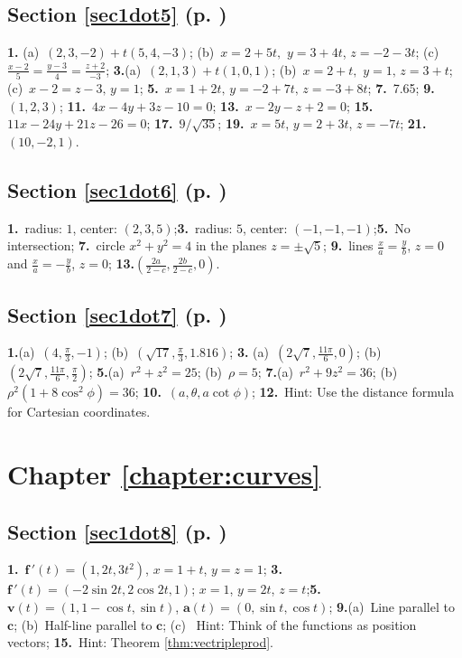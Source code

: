 \begin{multicols}{2}
\subsection*{Section \ref{sec1dot5} (p. \pageref{sec1dot5})}
\textbf{1.}
(a)~$(2,3,-2) + t(5,4,-3)$;\quad 
(b)~$x = 2 + 5t,$ $y = 3 + 4t$, $z = -2 - 3t$;\quad 
(c)~$\frac{x - 2}{5} = \frac{y - 3}{4} = \frac{z + 2}{-3}$;\quad
\textbf{3.}(a)~$(2,1,3) + t(1,0,1)$;\quad 
(b)~$x = 2 + t,$ $y = 1, \, z = 3 + t$;\quad 
(c)~$x - 2 = z - 3, \, y = 1$;\quad
\textbf{5.}~$x = 1 + 2t, \, y = -2 + 7t, \, z = -3 + 8t$;\quad
\textbf{7.}~7.65;\quad
\textbf{9.}~$(1,2,3)$;\quad
\textbf{11.}~$4x - 4y + 3z - 10 = 0$;\quad
\textbf{13.}~$x - 2y - z + 2 = 0$;\quad
\textbf{15.}~$11x - 24y + 21z - 26 = 0$;\quad 
\textbf{17.}~$9/\sqrt{35}$;\quad
\textbf{19.}~$x = 5t$, $y = 2 + 3t$, $z = -7t$;\quad
\textbf{21.}~$(10,-2,1)$.

\subsection*{Section \ref{sec1dot6} (p. \pageref{sec1dot6})}
\textbf{1.}~radius: $1$, center: $(2,3,5)$;\quad \textbf{3.}~radius: $5$, center: $(-1,-1,-1)$;\quad \textbf{5.}~No intersection;\quad
\textbf{7.}~circle $x^2 + y^2 = 4$ in the planes $z = \pm \sqrt{5}$;\quad
\textbf{9.}~lines
$\frac{x}{a} = \frac{y}{b}$, $z = 0$ and $\frac{x}{a} = -\frac{y}{b}$, $z = 0$;\quad
\textbf{13.}$\left( \frac{2a}{2 - c}, \frac{2b}{2 - c}, 0 \right)$.

\subsection*{Section \ref{sec1dot7} (p. \pageref{sec1dot7})}
\textbf{1.}(a)~$(4,\frac{\pi}{3},-1)$;\quad 
(b)~$(\sqrt{17},\frac{\pi}{3},1.816)$;\quad
\textbf{3.}
(a)~$(2\sqrt{7},\frac{11\pi}{6},0)$;\quad 
(b)~$(2\sqrt{7},\frac{11\pi}{6},\frac{\pi}{2})$;\quad
\textbf{5.}(a)~$r^2 + z^2 = 25$;\quad
(b)~$\rho = 5$;\quad
\textbf{7.}(a)~$r^2 + 9z^2 = 36$;\quad 
(b)~$\rho^2 ( 1 + 8 \cos^2 \phi ) = 36$;\quad
\textbf{10.}~$(a,\theta,a \cot \phi )$;\quad 
\textbf{12.}~Hint: Use the distance formula for Cartesian coordinates.

\section*{Chapter \ref{chapter:curves}}
\subsection*{Section \ref{sec1dot8} (p. \pageref{sec1dot8})}
\textbf{1.}~$\textbf{f}\,'(t) = (1,2t,3t^2)$, $x = 1 + t$, $y = z = 1$;\quad
\textbf{3.}~$\textbf{f}\,'(t) =
(-2\sin 2t,2\cos 2t,1)$; $x = 1$, $y = 2t$, $z = t$;\quad \textbf{5.}~$\textbf{v}(t) = (1,1 - \cos t,\sin t)$,
$\textbf{a}(t) = (0,\sin t,\cos t)$;\quad
\textbf{9.}(a)~Line parallel to $\mathbf{c}$;\quad 
(b)~Half-line parallel to $\mathbf{c}$;\quad 
(c)~ Hint:  Think of the functions as position vectors;\quad
\textbf{15.}~Hint: Theorem \ref{thm:vectripleprod}.


\end{multicols}

